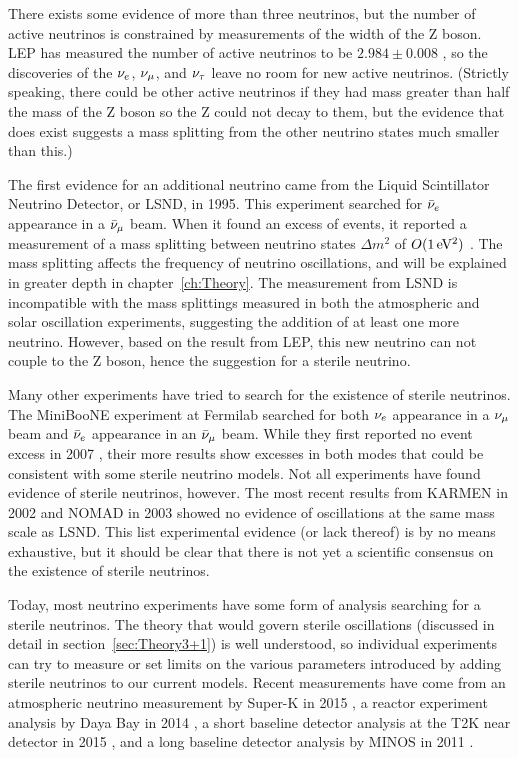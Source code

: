 There exists some evidence of more than three neutrinos, but the number of active neutrinos is constrained by measurements of the width of the Z boson. LEP has measured the number of active neutrinos to be $2.984 \pm 0.008$ \cite{ref:LEP}, so the discoveries of the $\nu_{e}$, $\nu_{\mu}$, and $\nu_{\tau}$ leave no room for new active neutrinos. (Strictly speaking, there could be other active neutrinos if they had mass greater than half the mass of the Z boson so the Z could not decay to them, but the evidence that does exist suggests a mass splitting from the other neutrino states much smaller than this.)

The first evidence for an additional neutrino came from the Liquid Scintillator Neutrino Detector, or LSND, in 1995. This experiment searched for $\bar{\nu}_{e}$ appearance in a $\bar{\nu}_{\mu}$ beam. When it found an excess of events, it reported a measurement of a mass splitting between neutrino states $\Delta m^2$ of $O(1\mbox{\,eV\textsuperscript{2}})$ \cite{ref:LSND}. The mass splitting affects the frequency of neutrino oscillations, and will be explained in greater depth in chapter~\ref{ch:Theory}. The measurement from LSND is incompatible with the mass splittings measured in both the atmospheric and solar oscillation experiments, suggesting the addition of at least one more neutrino. However, based on the result from LEP, this new neutrino can not couple to the Z boson, hence the suggestion for a sterile neutrino.

Many other experiments have tried to search for the existence of sterile neutrinos. The MiniBooNE experiment at Fermilab searched for both $\nu_{e}$ appearance in a $\nu_{\mu}$ beam and $\bar{\nu}_{e}$ appearance in an $\bar{\nu}_{\mu}$ beam. While they first reported no event excess in 2007 \cite{ref:Mini2007}, their more results show excesses in both modes \cite{ref:Mini2013} that could be consistent with some sterile neutrino models. Not all experiments have found evidence of sterile neutrinos, however. The most recent results from KARMEN in 2002 \cite{ref:KARMEN} and NOMAD in 2003 \cite{ref:NOMAD} showed no evidence of oscillations at the same mass scale as LSND. This list experimental evidence (or lack thereof) is by no means exhaustive, but it should be clear that there is not yet a scientific consensus on the existence of sterile neutrinos.

Today, most neutrino experiments have some form of analysis searching for a sterile neutrinos. The theory that would govern sterile oscillations (discussed in detail in section~\ref{sec:Theory3+1}) is well understood, so individual experiments can try to measure or set limits on the various parameters introduced by adding sterile neutrinos to our current models. Recent measurements have come from an atmospheric neutrino measurement by Super-K in 2015 \cite{ref:SuperKSterile}, a reactor experiment analysis by Daya Bay in 2014 \cite{ref:DayaSterile}, a short baseline detector analysis at the T2K near detector in 2015 \cite{ref:T2KSterile}, and a long baseline detector analysis by MINOS in 2011 \cite{ref:MINOSSterile}.

